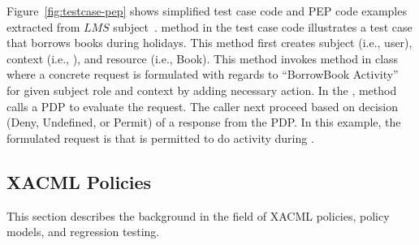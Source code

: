 Figure~\ref{fig:testcase-pep} shows simplified test case code and
PEP code examples extracted from $LMS$ subject~\cite{mouelhi09:tranforming}. 
 method in the test case code illustrates a test case that  borrows books during holidays.
This method first creates subject (i.e.,  user), context (i.e., ), and resource (i.e., Book).
This method invokes  method in  class where a concrete request is formulated with regards to ``BorrowBook Activity'' for given
subject role and context by adding necessary action. In the ,  method calls a PDP to evaluate the request. The caller next proceed based on decision (Deny, Undefined, or Permit) of a response from the PDP.
In this example, the formulated request is that  is permitted to do  activity during .






\subsection{XACML Policies} \label{sec:xacmlpolicies}
This section describes the background in the field of XACML policies, policy models, and regression testing.

